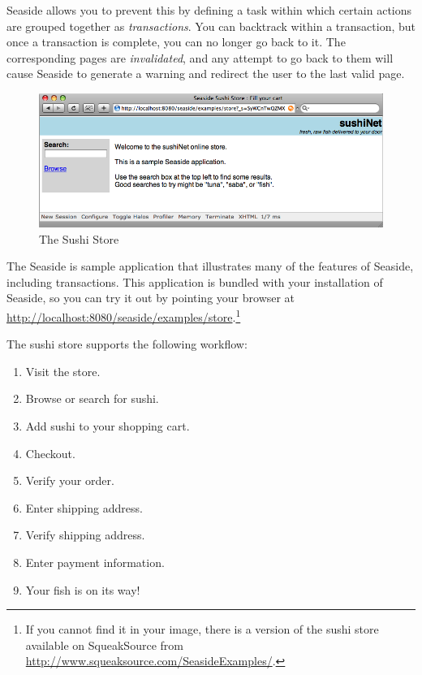 \documentclass[a4paper,10pt,twoside]{book}
\begin{document}
Seaside allows you to prevent this by defining a task within which certain actions are grouped together as \emph{transactions}.
You can backtrack within a transaction, but once a transaction is complete, you can no longer go back to it.
The corresponding pages are \emph{invalidated}, and any attempt to go back to them will cause Seaside to generate a warning and redirect the user to the last  valid page.

\begin{figure}[ht]
\begin{center}
\includegraphics[width=\textwidth]{sushiStore}
\caption{The Sushi Store}
\label{fig:sushiStore}
\end{center}
\end{figure}

The Seaside  is sample application that illustrates many of the features of Seaside, including transactions.
This application is bundled with your installation of Seaside, so you can try it out by pointing your browser at
\url{http://localhost:8080/seaside/examples/store}.\footnote{If you cannot find it in your image, there is a version of the sushi store available on SqueakSource from \url{http://www.squeaksource.com/SeasideExamples/}.}

The sushi store supports the following workflow:
\begin{enumerate}[itemsep=0pt]
  \item Visit the store.
  \item Browse or search for sushi.
  \item Add sushi to your shopping cart.
  \item Checkout.
  \item Verify your order.
  \item Enter shipping address.
  \item Verify shipping address.
  \item Enter payment information.
  \item Your fish is on its way!
\end{enumerate}
\end{document}

